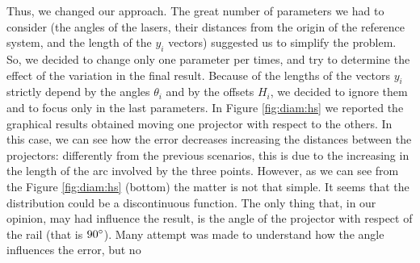Thus, we changed our approach. The great number of parameters we had to consider (the angles of the lasers, their distances from the origin of the reference system, and the length of the $y_i$ vectors) suggested us to simplify the problem. So, we decided to change only one parameter per times, and try to determine the effect of the variation in the final result. Because of the lengths of the vectors $y_i$ strictly depend by the angles $\theta_i$ and by the offsets $H_i$, we decided to ignore them and to focus only in the last parameters. In Figure \ref{fig:diam:hs} we reported the graphical results obtained moving one projector with respect to the others. In this case, we can see how the error decreases increasing the distances between the projectors: differently from the previous scenarios, this is due to the increasing in the length of the arc involved by the three points. However, as we can see from the Figure \ref{fig:diam:hs} (bottom)  the matter is not that simple. It seems that the distribution could be a discontinuous function. The only thing that, in our opinion, may had influence the result, is the angle of the projector with respect of the rail (that is $90\degree$). Many attempt was made to understand how the angle influences the error, but no
  \clearpage
